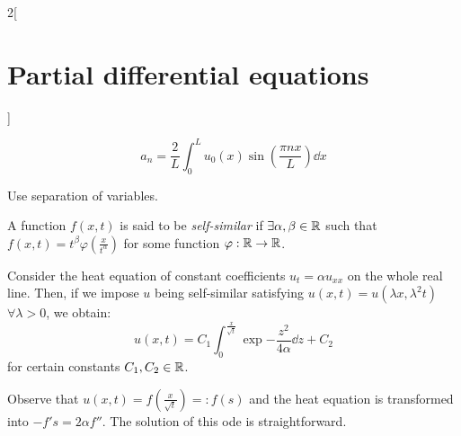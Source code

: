 \documentclass[../../../main_math.tex]{subfiles}
\begin{document}
\begin{multicols}{2}[\section{Partial differential equations}]
\begin{proposition}
\begin{equation*}
      a_n =\frac{2}{L}\int_{0}^Lu_0(x)\sin\left(\frac{\pi n x}{L}\right)\dd{x}
    \end{equation*}
  \end{proposition}
  \begin{sproof}
    Use separation of variables.
  \end{sproof}
  \begin{definition}
    A function $f(x,t)$ is said to be \emph{self-similar} if $\exists \alpha,\beta\in\mathbb{R}$ such that $f(x,t)=t^\beta\varphi\left(\frac{x}{t^\alpha}\right)$ for some function $\varphi:\mathbb{R}\rightarrow\mathbb{R}$.
  \end{definition}
  \begin{proposition}
    Consider the heat equation of constant coefficients $ u_{t} =\alpha u_{xx}$ on the whole real line. Then, if we impose $u$ being self-similar satisfying $u(x,t)=u(\lambda x,\lambda^2t)$ $\forall\lambda>0$, we obtain:
    \begin{equation}\label{PDE:selfsimilarsol}
      u(x,t)=C_1\int_0^{\frac{x}{\sqrt{t}}}\exp{-\frac{z^2}{4\alpha}}\dd{z} +C_2
    \end{equation}
    for certain constants $C_1, C_2\in\mathbb{R}$.
  \end{proposition}
  \begin{sproof}
    Observe that $u(x,t) = f(\frac{x}{\sqrt{t}})=:f(s)$ and the heat equation is transformed into $-f's=2\alpha f''$. The solution of this ode is straightforward.
  \end{sproof}

\end{multicols}
\end{document}
